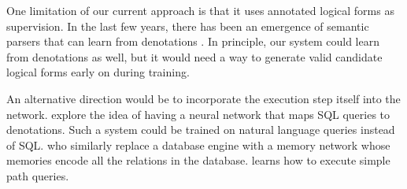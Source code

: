 \documentclass[11pt,letterpaper]{article}
\begin{document}
One limitation of our current approach is that it 
uses annotated logical forms as supervision.
In the last few years, there has been an emergence of
semantic parsers that can learn from denotations 
\cite{clarke10world,liang11dcs,berant2013freebase,artzi2013weakly}.
In principle, our system could learn from denotations as well,
but it would need a way to generate valid candidate logical forms
early on during training.

An alternative direction would be to incorporate the execution
step itself into the network.  
explore the idea of having a neural network that maps
SQL queries to denotations.  Such a system could be trained
on natural language queries instead of SQL.
who similarly replace a database engine with a memory network
whose memories encode all the relations in the database.
 learns how to execute simple path queries.





\end{document}
